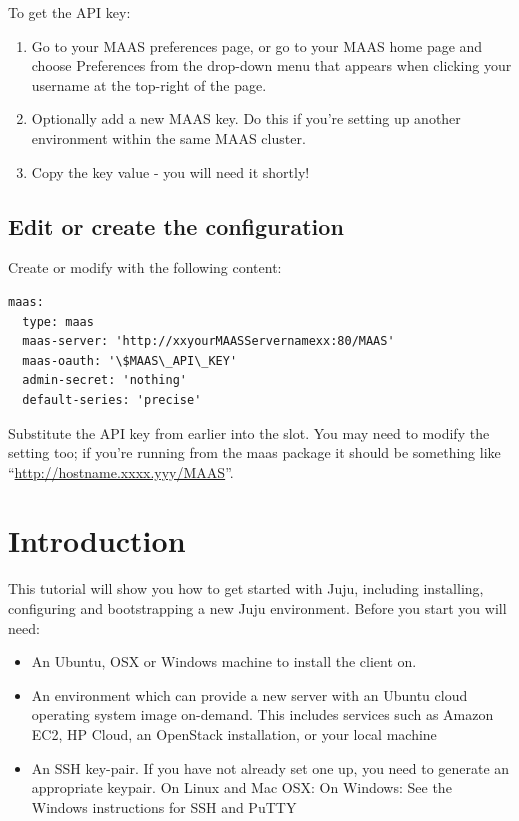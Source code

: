 \documentclass[letterpaper,10pt,english]{sphinxmanual}
\begin{document}
To get the API key:
\begin{enumerate}
\item {} 
Go to your MAAS preferences page, or go to your MAAS home page and
choose Preferences from the drop-down menu that appears when clicking
your username at the top-right of the page.

\item {} 
Optionally add a new MAAS key. Do this if you're setting up another
environment within the same MAAS cluster.

\item {} 
Copy the key value - you will need it shortly!

\end{enumerate}


\section{Edit or create the configuration}
\label{config-maas:edit-or-create-the-configuration}
Create or modify  with the following
content:

\begin{Verbatim}[commandchars=\\\{\}]
maas:
  type: maas
  maas-server: 'http://xxyourMAASServernamexx:80/MAAS'
  maas-oauth: '\$MAAS\_API\_KEY'
  admin-secret: 'nothing'
  default-series: 'precise'
\end{Verbatim}

Substitute the API key from earlier into the  slot. You
may need to modify the  setting too; if you're running
from the maas package it should be something like
``\href{http://hostname.xxxx.yyy/MAAS}{http://hostname.xxxx.yyy/MAAS}''.


\chapter{Introduction}
\label{index:introduction}\label{index:videos}
This tutorial will show you how to get started with Juju, including
installing, configuring and bootstrapping a new Juju environment.
Before you start you will need:
\begin{itemize}
\item {} 
An Ubuntu, OSX or Windows machine to install the client on.

\item {} 
An environment which can provide a new server with an Ubuntu cloud
operating system image on-demand. This includes services such as
Amazon EC2, HP Cloud, an OpenStack installation, or your local machine

\item {} 
An SSH key-pair. If you have not already set one up, you need to
generate an appropriate keypair. On Linux and Mac OSX:  On Windows: See the Windows instructions for SSH and
PuTTY

\end{itemize}
\end{document}
